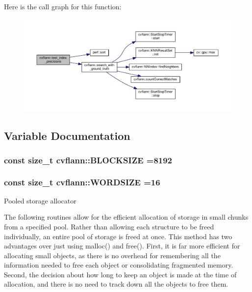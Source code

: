 Here is the call graph for this function\-:\nopagebreak
\begin{figure}[H]
\begin{center}
\leavevmode
\includegraphics[width=350pt]{namespacecvflann_aa27ca9a7a0e97f3b09f781421b5ffa05_cgraph}
\end{center}
\end{figure}




\subsection{Variable Documentation}
\hypertarget{namespacecvflann_af6813d97f5ad15bea15d4c914d406e24}{
\subsubsection[{B\-L\-O\-C\-K\-S\-I\-Z\-E}]{\setlength{\rightskip}{0pt plus 5cm}const size\-\_\-t cvflann\-::\-B\-L\-O\-C\-K\-S\-I\-Z\-E =8192}}\label{namespacecvflann_af6813d97f5ad15bea15d4c914d406e24}
\hypertarget{namespacecvflann_a7140ea8434f5b752d5b2b1b4155aba04}{
\subsubsection[{W\-O\-R\-D\-S\-I\-Z\-E}]{\setlength{\rightskip}{0pt plus 5cm}const size\-\_\-t cvflann\-::\-W\-O\-R\-D\-S\-I\-Z\-E =16}}\label{namespacecvflann_a7140ea8434f5b752d5b2b1b4155aba04}
Pooled storage allocator

The following routines allow for the efficient allocation of storage in small chunks from a specified pool. Rather than allowing each structure to be freed individually, an entire pool of storage is freed at once. This method has two advantages over just using malloc() and free(). First, it is far more efficient for allocating small objects, as there is no overhead for remembering all the information needed to free each object or consolidating fragmented memory. Second, the decision about how long to keep an object is made at the time of allocation, and there is no need to track down all the objects to free them. 